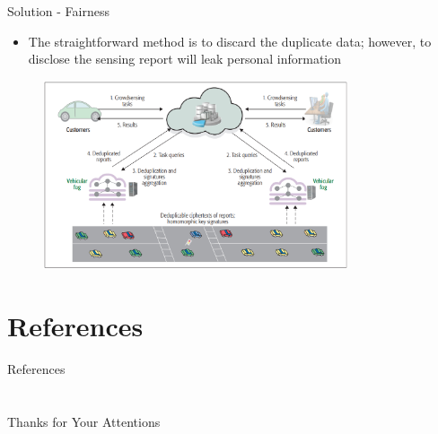 \documentclass{beamer}
\begin{document}
\begin{frame}{Solution - Fairness}
    \begin{itemize}
        \item {The straightforward method is to discard the duplicate data; however, to disclose the sensing report will leak personal information}
    \end{itemize}
    \begin{figure}[t]
        \centering
        \includegraphics[width=0.8\textwidth]{figures/4.png}
    \end{figure}
\end{frame}

\section{References}
\calcreferencespagetotal %
\begin{frame}[allowframebreaks]{References}
    \fontsize{9pt}{13}\selectfont
    
    
\end{frame}

\section{}

\begin{frame}
    \centering
    \Large{Thanks for Your Attentions}
\end{frame}
\end{document}

